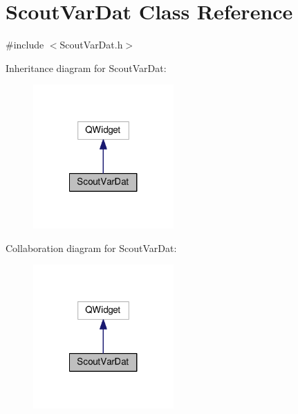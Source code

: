 \hypertarget{class_scout_var_dat}{\section{Scout\-Var\-Dat Class Reference}
\label{class_scout_var_dat}
}


{\ttfamily \#include $<$Scout\-Var\-Dat.\-h$>$}



Inheritance diagram for Scout\-Var\-Dat\-:\nopagebreak
\begin{figure}[H]
\begin{center}
\leavevmode
\includegraphics[width=152pt]{class_scout_var_dat__inherit__graph}
\end{center}
\end{figure}


Collaboration diagram for Scout\-Var\-Dat\-:\nopagebreak
\begin{figure}[H]
\begin{center}
\leavevmode
\includegraphics[width=152pt]{class_scout_var_dat__coll__graph}
\end{center}
\end{figure}
